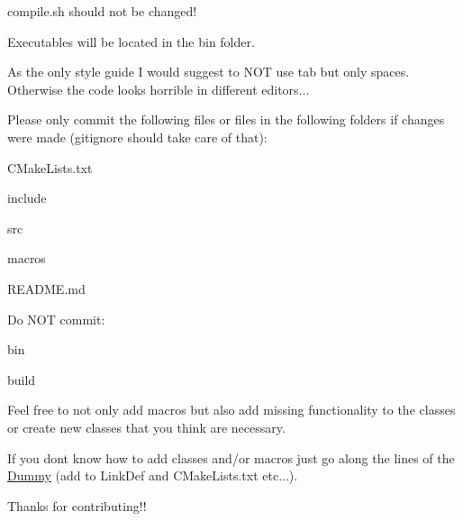 \begin{DoxyItemize}
\item compile.\+sh should not be changed!
\item Executables will be located in the bin folder.
\item As the only style guide I would suggest to N\+OT use tab but only spaces. Otherwise the code looks horrible in different editors...
\end{DoxyItemize}

Please only commit the following files or files in the following folders if changes were made (gitignore should take care of that)\+:


\begin{DoxyItemize}
\item C\+Make\+Lists.\+txt
\item include
\item src
\item macros
\item R\+E\+A\+D\+M\+E.\+md
\end{DoxyItemize}

Do N\+OT commit\+:


\begin{DoxyItemize}
\item bin
\item build
\end{DoxyItemize}

Feel free to not only add macros but also add missing functionality to the classes or create new classes that you think are necessary.

If you don\textquotesingle{}t know how to add classes and/or macros just go along the lines of the \hyperlink{classDummy}{Dummy} (add to Link\+Def and C\+Make\+Lists.\+txt etc...).

Thanks for contributing!! 
